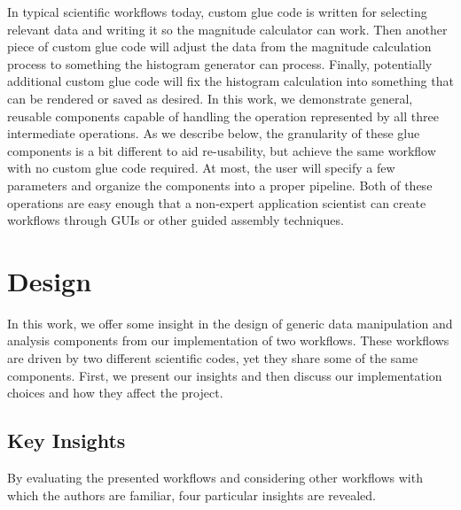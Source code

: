 \documentclass[conference]{IEEEtran}
\begin{document}
In typical scientific workflows today, custom glue code is written for
selecting relevant data and writing it so the magnitude calculator can work.
Then another piece of custom glue code will adjust the data from the magnitude
calculation process to something the histogram generator can process.  Finally,
potentially additional custom glue code will fix the histogram calculation into
something that can be rendered or saved as desired.  In this work, we
demonstrate general, reusable components capable of handling the operation
represented by all three intermediate operations.
As we describe below, the
granularity of these glue components is a bit different to aid re-usability, but
achieve the same workflow with no custom glue code required. At most, the user
will specify a few parameters and organize the components into a proper
pipeline. Both of these operations are easy enough that a non-expert application
scientist can create workflows through GUIs or other guided assembly techniques.

\section{Design}
\label{s:design}

In this work, we offer some insight in the design of generic data manipulation
and analysis components from our implementation of two workflows. These
workflows are driven by two different scientific codes, yet they share some of
the same components. First, we present our insights and then discuss our
implementation choices and how they affect the project.

\subsection{Key Insights}

By evaluating the presented workflows and considering other workflows with
which the authors are familiar, four particular insights are revealed.
\end{document}
